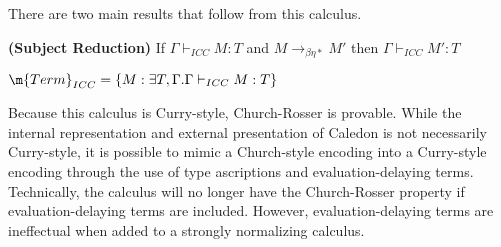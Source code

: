 There are two main results that follow from this calculus.

\begin{theorem}
\textbf{(Subject Reduction)} If $\Gamma \vdash_{ICC} M : T$ and $M \rightarrow_{\beta\eta*} M'$ then $\Gamma \vdash_{ICC} M' : T$
\end{theorem}

\begin{definition}
$ \m{Term}_{ICC}  = \{ M : \exists T,\Gamma . \Gamma \vdash_{ICC} M : T \}$
\end{definition}

Because this calculus is Curry-style, Church-Rosser is provable.  
While the internal representation and external presentation of Caledon is not necessarily Curry-style, 
it is possible to mimic a Church-style encoding into a Curry-style encoding through the use of type ascriptions
and evaluation-delaying terms.  Technically, the calculus will no longer have the Church-Rosser property if 
evaluation-delaying terms are included. However, evaluation-delaying terms are ineffectual when added to a strongly normalizing calculus.

